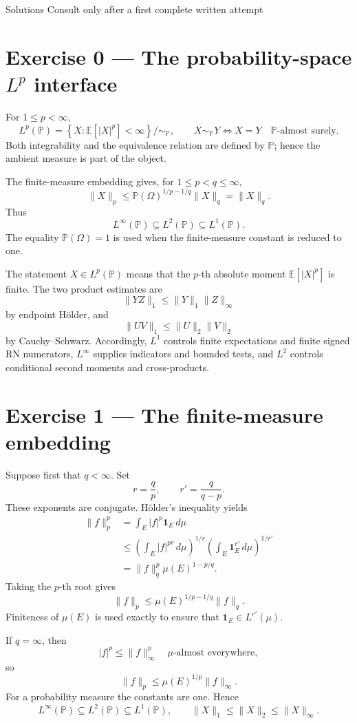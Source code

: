 
\sheettitle
  {Solutions}
  {Consult only after a first complete written attempt}

\section*{Exercise 0 — The probability-space $L^p$ interface}

For $1\le p<\infty$,
\[
L^p(\mathbb P)
=
\left\{
X:\mathbb E[|X|^p]<\infty
\right\}\big/\!\sim_{\mathbb P},
\qquad
X\sim_{\mathbb P}Y
\Longleftrightarrow
X=Y\quad\mathbb P\text{-almost surely}.
\]
Both integrability and the equivalence relation are defined by $\mathbb P$; hence the ambient measure is part of the object.

The finite-measure embedding gives, for $1\le p<q\le\infty$,
\[
\|X\|_p
\le
\mathbb P(\Omega)^{1/p-1/q}\|X\|_q
=
\|X\|_q.
\]
Thus
\[
L^\infty(\mathbb P)
\subseteq
L^2(\mathbb P)
\subseteq
L^1(\mathbb P).
\]
The equality $\mathbb P(\Omega)=1$ is used when the finite-measure constant is reduced to one.

The statement $X\in L^p(\mathbb P)$ means that the $p$-th absolute moment $\mathbb E[|X|^p]$ is finite. The two product estimates are
\[
\|YZ\|_1
\le
\|Y\|_1\|Z\|_\infty
\]
by endpoint Hölder, and
\[
\|UV\|_1
\le
\|U\|_2\|V\|_2
\]
by Cauchy--Schwarz. Accordingly, $L^1$ controls finite expectations and finite signed RN numerators, $L^\infty$ supplies indicators and bounded tests, and $L^2$ controls conditional second moments and cross-products.

\section*{Exercise 1 — The finite-measure embedding}

Suppose first that $q<\infty$. Set
\[
r=\frac qp,
\qquad
r'=\frac q{q-p}.
\]
These exponents are conjugate. Hölder's inequality yields
\[
\begin{aligned}
\|f\|_p^p
&=
\int_E |f|^p\mathbf 1_E\,d\mu\\
&\le
\left(\int_E|f|^{pr}\,d\mu\right)^{1/r}
\left(\int_E\mathbf 1_E^{r'}\,d\mu\right)^{1/r'}\\
&=
\|f\|_q^p\mu(E)^{1-p/q}.
\end{aligned}
\]
Taking the $p$-th root gives
\[
\|f\|_p
\le
\mu(E)^{1/p-1/q}\|f\|_q.
\]
Finiteness of $\mu(E)$ is used exactly to ensure that $\mathbf 1_E\in L^{r'}(\mu)$.

If $q=\infty$, then
\[
|f|^p
\le
\|f\|_\infty^p
\quad\mu\text{-almost everywhere},
\]
so
\[
\|f\|_p
\le
\mu(E)^{1/p}\|f\|_\infty.
\]
For a probability measure the constants are one. Hence
\[
L^\infty(\mathbb P)
\subseteq
L^2(\mathbb P)
\subseteq
L^1(\mathbb P),
\qquad
\|X\|_1\le\|X\|_2\le\|X\|_\infty.
\]

